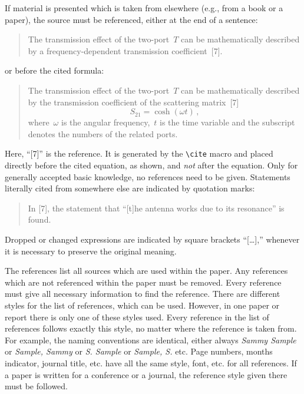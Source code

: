 If material is presented which is taken from elsewhere (e.g., from a book or a paper), the source must
be referenced, either at the end of a sentence:
\begin{quote}
	\small
	The transmission effect of the two-port~$T$ can be mathematically described by a frequency-dependent transmission coefficient~[7].
\end{quote}
or before the cited formula:
\begin{quote}
	\small
	The transmission effect of the two-port~$T$ can be mathematically described by the transmission coefficient of the scattering matrix~[7] %
	\begin{equation}
	S_{21} = \cosh \left( \omega t \right)\, ,
	\end{equation}
	where~$\omega$ is the angular frequency,~$t$ is the time variable and the subscript denotes the numbers of the related ports.
\end{quote}
Here,  “[7]” is the reference. 
It is generated by the \verb|\cite| macro and placed directly before the cited equation, as shown, and \emph{not} after the equation. 
Only for generally accepted basic knowledge, no references need to be given.
Statements literally cited from somewhere else are indicated by quotation marks: 
\begin{quote}
	\small
	In [7], the statement that “[t]he antenna works due to its resonance” is found.
\end{quote}
Dropped or changed expressions are indicated by square brackets “[\ldots],” whenever it is necessary to preserve the original meaning. 
	

The references list all sources which are used within the paper.
Any references which are not referenced within the paper must be removed. 
Every reference must give all necessary information to find the reference. 
There are different styles for the list of references, which can be used. 
However, in one paper or report there is only one of these styles used.
Every reference in the list of references follows exactly this style, no matter where the reference is taken from. 
For example, the naming conventions are identical, either always \emph{Sammy Sample} or \emph{Sample, Sammy} or \emph{S. Sample} or \emph{Sample, S.} etc. 
Page numbers, months indicator, journal title, etc. have all the same style, font, etc. for all references.
If a paper is written for a conference or a journal, the reference style given there must be followed. 

